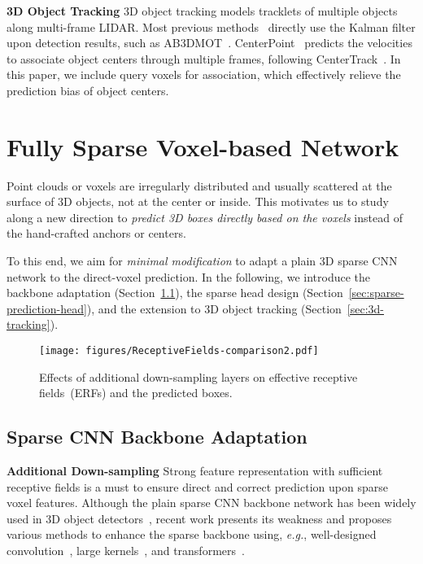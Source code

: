 \documentclass[10pt,twocolumn,letterpaper]{article}
\begin{document}
\vspace{0.5em}
\noindent
\textbf{3D Object Tracking}
3D object tracking models tracklets of multiple objects along multi-frame LIDAR. Most previous methods~\cite{probabilistic-tracking,cbmot,ab3dmot} directly use the Kalman filter upon detection results, such as AB3DMOT~\cite{ab3dmot}. CenterPoint~\cite{centerpoint} predicts the velocities to associate object centers through multiple frames, following CenterTrack~\cite{centertrack}. In this paper, we include query voxels for association, which effectively relieve the prediction bias of object centers.

\section{Fully Sparse Voxel-based Network}
\label{sec:voxelnext}
Point clouds or voxels are irregularly distributed and usually scattered at the surface of 3D objects, not at the center or inside. This motivates us to study along a new direction to {\em predict 3D boxes directly based on the voxels} instead of the hand-crafted anchors or centers.

To this end, we aim for {\em minimal modification} to adapt a plain 3D sparse CNN network to the direct-voxel prediction. In the following, we introduce the backbone adaptation (Section~\ref{sec:backbone-adaptation}), the sparse head design (Section~\ref{sec:sparse-prediction-head}), and the extension to 3D object tracking (Section~\ref{sec:3d-tracking}).

\begin{figure}[t]
\begin{center}
   \texttt{[image: figures/ReceptiveFields-comparison2.pdf]}
   \caption{Effects of additional down-sampling layers on effective receptive fields~(ERFs) and the predicted boxes.}
   \label{fig:effective-receptive-fields}
\end{center}
\end{figure}
\subsection{Sparse CNN Backbone Adaptation}
\label{sec:backbone-adaptation}
\noindent
\textbf{Additional Down-sampling}
Strong feature representation with sufficient receptive fields is a must to ensure direct and correct prediction upon sparse voxel features.
Although the plain sparse CNN backbone network has been widely used in 3D object detectors~\cite{pvrcnn,voxel-rcnn, centerpoint}, recent work presents its weakness and proposes various methods to enhance the sparse backbone using, {\em e.g.}, well-designed convolution~\cite{focal-sparse-conv}, large kernels~\cite{largekernel3d}, and transformers~\cite{voxeltransformer, lai2022stratified, lai2023spherical}.
\end{document}
